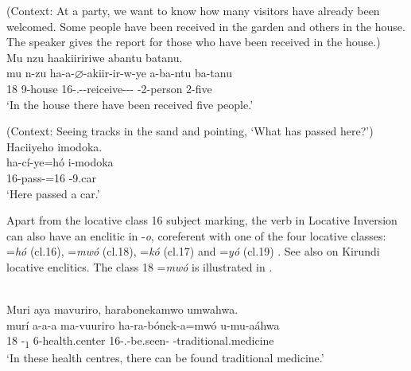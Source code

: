 \documentclass[output=paper]{langscibook}
\begin{document}
\ea
\label{bkm:Ref73976458}
(Context: At a party, we want to know how many visitors have already been welcomed. Some people have been received in the garden and others in the house. The speaker gives the report for those who have been received in the house.)\\
Mu nzu haakiiririwe abantu batanu.\\
\gll
mu  n-zu  ha-a-$\varnothing$-akiir-ir-w-ye  a-ba-ntu  ba-tanu\\
18  9-house  16\SM-\N.\PST-\CJ{}-reiceive-\APPL-\PASS-\PFV{}  \AUG-{}2-person  2-five\\
\glt
‘In the house there have been received five people.’\\

\z

\ea
\label{bkm:Ref81464317}
(Context: Seeing tracks in the sand and pointing, ‘What has passed here?’)\\
  Haciiyeho imodoka.\\
\gll
  ha-cí-ye=hó  i-modoka\\
  16\SM{}-pass-\PFV{}=16  \AUG-9.car\\
\glt
  ‘Here passed a car.’\\


\z

Apart from the locative class 16 subject marking, the verb in Locative Inversion can also have an enclitic in -\textit{o}, coreferent with one of the four locative classes: =\textit{hó} (cl.16), =\textit{mwó} (cl.18), =\textit{kó} (cl.17) and =\textit{yó} (cl.19) \citep[64]{Meeussen1959}. See also \citet{DevosEtAl2017} on Kirundi locative enclitics. The class 18 =\textit{mwó} is illustrated in .

\ea
\label{bkm:Ref79856645}
\citep[137]{Nshemezimana2016}\\
Muri aya mavuriro, harabonekamwo umwahwa.\\
\gll
murí  a-a-a  ma-vuuriro  ha-ra-bónek-a=mwó   u-mu-aáhwa \\
18  -\DEM{}\textsubscript{1}  6-health.center  16\SM-\PRS.\DJ-{}be.seen-   -traditional.medicine \\
\glt
  ‘In these health centres, there can be found traditional medicine.’\\
\end{document}
